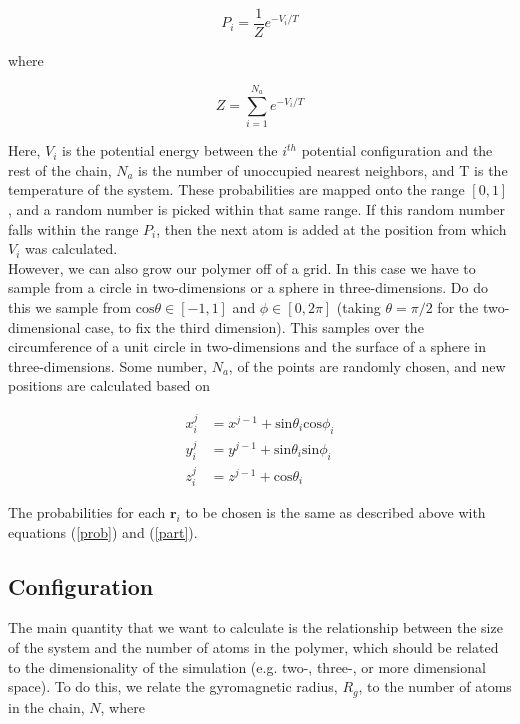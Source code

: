 \documentclass{article}
\begin{document}
\begin{multicols}{2}
\begin{equation}
\label{prob}
P_i = \frac{1}{Z} e^{-V_i/T}
\end{equation}

\noindent where

\begin{equation}
\label{part}
Z = \sum \limits _{i=1}^{N_a} e^{-V_i/T}
\end{equation}

\noindent Here, $V_i$ is the potential energy between the $i^{th}$ potential configuration and the rest of the chain, $N_a$ is the number of unoccupied nearest neighbors, and T is the temperature of the system.  These probabilities are mapped onto the range $[0,1]$, and a random number is picked within that same range.  If this random number falls within the range $P_i$, then the next atom is added at the position from which $V_i$ was calculated.  \\

However, we can also grow our polymer off of a grid.  In this case we have to sample from a circle in two-dimensions or a sphere in three-dimensions.  Do do this we sample from $\mathrm{cos}\theta \in [-1,1]$ and $\phi \in [0,2\pi]$ (taking $\theta = \pi/2$ for the two-dimensional case, to fix the third dimension).  This samples over the circumference of a unit circle in two-dimensions and the surface of a sphere in three-dimensions.  Some number, $N_a$, of the points are randomly chosen, and new positions are calculated based on 

\begin{equation}
\begin{split}
x^{j}_i & = x^{j-1} + \mathrm{sin}\theta _i \mathrm{cos}\phi _i \\
y^{j}_i & = y^{j-1} + \mathrm{sin} \theta _i \mathrm{sin} \phi _i \\
z^{j}_i & = z^{j-1} + \mathrm{cos} \theta _i
\end{split}
\end{equation}

\noindent The probabilities for each $\textbf{r}_i$ to be chosen is the same as described above with equations (\ref{prob}) and (\ref{part}).

\subsection{Configuration}

The main quantity that we want to calculate is the relationship between the size of the system and the number of atoms in the polymer, which should be related to the dimensionality of the simulation (e.g. two-, three-, or more dimensional space).  To do this, we relate the gyromagnetic radius, $R_g$, to the number of atoms in the chain, $N$, where 


\end{multicols}
\end{document}
